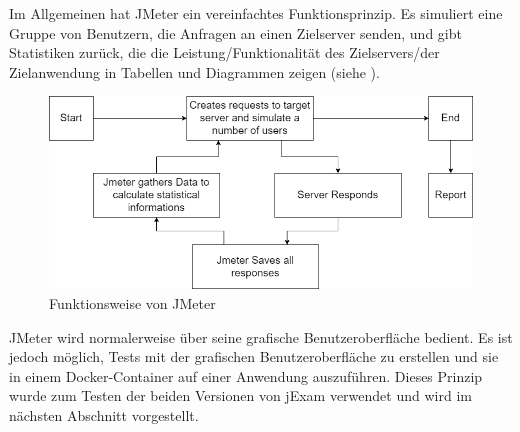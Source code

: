 Im Allgemeinen hat JMeter ein vereinfachtes Funktionsprinzip. Es simuliert
eine Gruppe von Benutzern, die Anfragen an einen Zielserver senden, und
gibt Statistiken zurück, die die Leistung/Funktionalität des Zielservers/der
Zielanwendung in Tabellen und Diagrammen zeigen (siehe ).

\begin{figure}[H]
    \centering
    \includegraphics[scale=0.5]{images/jmeter-princip}
    \caption{Funktionsweise von JMeter} \label{fig:jmeter-prinzip}
\end{figure}

JMeter wird normalerweise  über seine grafische Benutzeroberfläche
bedient. Es ist  jedoch möglich, Tests mit der grafischen
Benutzeroberfläche zu erstellen und sie in einem Docker-Container auf einer
Anwendung auszuführen. Dieses  Prinzip wurde zum Testen der beiden Versionen
von jExam verwendet und wird  im nächsten Abschnitt vorgestellt.






